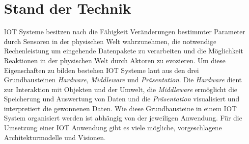 \documentclass[BMR,Bachelor,ngerman]{twbook}%
\begin{document}


\clearpage

\chapter{Stand der Technik}
\ac{IOT} Systeme besitzen nach  die Fähigkeit Veränderungen bestimmter Parameter durch Sensoren in der physischen Welt wahrzunehmen, die notwendige Rechenleistung um eingehende Datenpakete zu verarbeiten und die Möglichkeit Reaktionen in der physischen Welt durch Aktoren zu evozieren. Um diese Eigenschaften zu bilden bestehen \ac{IOT} Systeme laut  aus den drei Grundbausteinen \emph{Hardware}, \emph{Middleware}  und  \emph{Präsentation}. Die \emph{Hardware} dient zur Interaktion mit Objekten und der Umwelt, die \emph{Middleware} ermöglicht die Speicherung und Auswertung von Daten und die \emph{Präsentation} visualisiert und interpretiert die gewonnenen Daten. Wie diese Grundbausteine in einem \ac{IOT} System organisiert werden ist abhängig von der jeweiligen Anwendung. Für die Umsetzung einer \ac{IOT} Anwendung gibt es viele mögliche, vorgeschlagene Architekturmodelle und Visionen.
\end{document}
